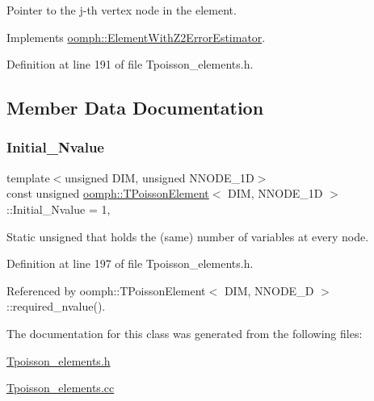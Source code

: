 Pointer to the j-\/th vertex node in the element. 



Implements \hyperlink{classoomph_1_1ElementWithZ2ErrorEstimator_a0eedccc33519f852c5dc2055ddf2774b}{oomph\+::\+Element\+With\+Z2\+Error\+Estimator}.



Definition at line 191 of file Tpoisson\+\_\+elements.\+h.



\subsection{Member Data Documentation}
\mbox{\label{classoomph_1_1TPoissonElement_ae2cd9ed9da1a72cd8b172884dae47d6d}} 
\subsubsection{\texorpdfstring{Initial\+\_\+\+Nvalue}{Initial\_Nvalue}}
{\footnotesize\ttfamily template$<$unsigned D\+IM, unsigned N\+N\+O\+D\+E\+\_\+1D$>$ \\
const unsigned \hyperlink{classoomph_1_1TPoissonElement}{oomph\+::\+T\+Poisson\+Element}$<$ D\+IM, N\+N\+O\+D\+E\+\_\+1D $>$\+::Initial\+\_\+\+Nvalue = 1\hspace{0.3cm}{\ttfamily [static]}, {\ttfamily [private]}}



Static unsigned that holds the (same) number of variables at every node. 



Definition at line 197 of file Tpoisson\+\_\+elements.\+h.



Referenced by oomph\+::\+T\+Poisson\+Element$<$ D\+I\+M, N\+N\+O\+D\+E\+\_\+D $>$\+::required\+\_\+nvalue().



The documentation for this class was generated from the following files\+:\begin{DoxyCompactItemize}
\item 
\hyperlink{Tpoisson__elements_8h}{Tpoisson\+\_\+elements.\+h}\item 
\hyperlink{Tpoisson__elements_8cc}{Tpoisson\+\_\+elements.\+cc}\end{DoxyCompactItemize}
